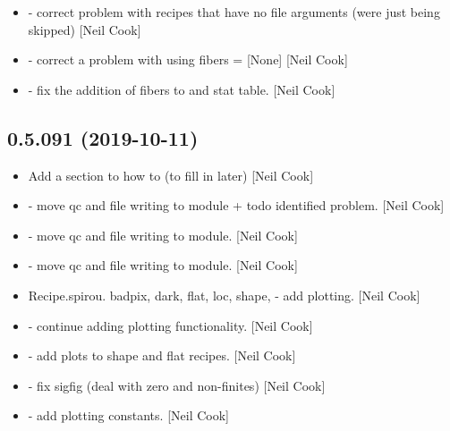 \documentclass[a4paper,10pt,english]{report}
\begin{document}
\begin{itemize}
\item {} 
 - correct problem with recipes that have no
file arguments (were just being skipped) {[}Neil Cook{]}

\item {} 
 - correct a problem with using fibers = {[}None{]}
{[}Neil Cook{]}

\item {} 
 - fix the addition of fibers to  and stat
table. {[}Neil Cook{]}

\end{itemize}


\subsection{0.5.091 (2019-10-11)}
\label{\detokenize{misc/changelog:id52}}\begin{itemize}
\item {} 
Add a section to how to (to fill in later) {[}Neil Cook{]}

\item {} 
 - move qc and file writing to module + todo
identified problem. {[}Neil Cook{]}

\item {} 
 - move qc and file writing to module.
{[}Neil Cook{]}

\item {} 
 - move qc and file writing to module.
{[}Neil Cook{]}

\item {} 
Recipe.spirou. badpix, dark, flat, loc, shape,  - add
plotting. {[}Neil Cook{]}

\item {} 
 - continue adding plotting functionality. {[}Neil Cook{]}

\item {} 
 - add plots to shape and
flat recipes. {[}Neil Cook{]}

\item {} 
 - fix sigfig (deal with zero and non-finites)
{[}Neil Cook{]}

\item {} 
 - add plotting constants.
{[}Neil Cook{]}

\end{itemize}
\end{document}

